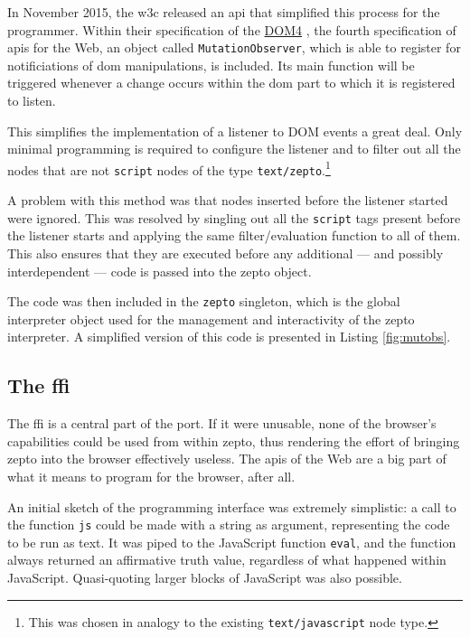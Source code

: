 \documentclass[oneside,11pt,xetex]{scrbook}
\begin{document}
In November 2015, the \gls{w3c} released an \gls{api} that simplified this process
for the programmer. Within their specification of the
\href{https://www.w3.org/TR/dom/#mutationobserver}{DOM4} \parencite{DOM4} , the fourth
specification of \gls{api}s for the Web, an object called \texttt{MutationObserver}, which is
able to register for notificiations of \gls{dom} manipulations, is included. Its main function
will be triggered whenever a change occurs within the \gls{dom} part to which it is registered
to listen.

This simplifies the implementation of a listener to DOM events a great deal. Only minimal programming
is required to configure the listener and to filter out all the nodes that are not \texttt{script} nodes
of the type \texttt{text/zepto}.\footnote{This was chosen in analogy to the existing \texttt{text/javascript}
node type.}

A problem with this method was that nodes inserted before the listener started were ignored.
This was resolved by singling out all the \texttt{script} tags present before the listener
starts and applying the same filter/evaluation function to all of them. This also ensures
that they are executed before any additional --- and possibly interdependent --- code is
passed into the zepto object.

The code was then included in the \texttt{zepto} singleton, which is the global interpreter object
used for the management and interactivity of the zepto interpreter. A simplified version of this
code is presented in Listing \ref{fig:mutobs}.

\subsection{The \gls{ffi}}
\label{sec:ffi}

The \gls{ffi} is a central part of the port. If it were unusable, none of the browser's
capabilities could be used from within zepto, thus rendering the effort of bringing zepto into
the browser effectively useless. The \gls{api}s of the Web are a big part of what it means to
program for the browser, after all.

An initial sketch of the programming interface was extremely simplistic: a call to the
function \texttt{js} could be made with a string as argument, representing the code to
be run as text. It was piped to the JavaScript function
\texttt{eval}, and the function always returned an affirmative truth value, regardless of
what happened within JavaScript. Quasi-quoting larger blocks of JavaScript was also possible.
\end{document}
